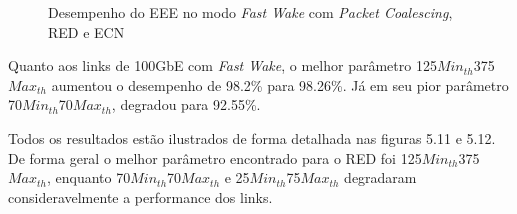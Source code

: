 \begin{figure}[p]
    \centering
    \label{fig:PerfEEEFastWakePaCoREDECN}
    
    \hfill
    
    \caption{\centering Desempenho do EEE no modo \emph{Fast Wake} com \emph{Packet Coalescing}, RED e ECN}
\end{figure}

Quanto aos links de 100GbE com \emph{Fast Wake}, o melhor parâmetro 125{$\mathit{Min}_\mathit{th}$}375{$\mathit{Max}_\mathit{th}$} aumentou o desempenho de 98.2\% para 98.26\%. Já em seu pior parâmetro 70{$\mathit{Min}_\mathit{th}$}70{$\mathit{Max}_\mathit{th}$}, degradou para 92.55\%.

Todos os resultados estão ilustrados de forma detalhada nas figuras 5.11 e 5.12. De forma geral o melhor parâmetro encontrado para o RED foi 125{$\mathit{Min}_\mathit{th}$}375{$\mathit{Max}_\mathit{th}$}, enquanto  70{$\mathit{Min}_\mathit{th}$}70{$\mathit{Max}_\mathit{th}$} e 25{$\mathit{Min}_\mathit{th}$}75{$\mathit{Max}_\mathit{th}$} degradaram consideravelmente a performance dos links.

